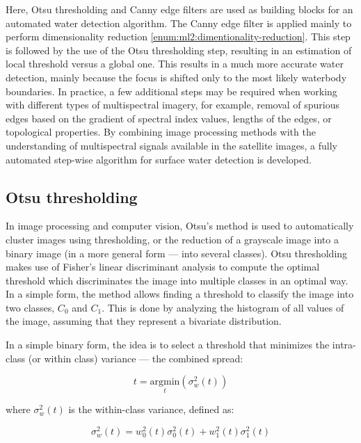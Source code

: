Here, Otsu thresholding and Canny edge filters are used as building blocks for an automated water detection algorithm. The Canny edge filter is applied mainly to perform dimensionality reduction \ref{enum:ml2:dimentionality-reduction}. This step is followed by the use of the Otsu thresholding step, resulting in an estimation of local threshold versus a global one. This results in a much more accurate water detection, mainly because the focus is shifted only to the most likely waterbody boundaries. In practice, a few additional steps may be required when working with different types of multispectral imagery, for example, removal of spurious edges based on the gradient of spectral index values, lengths of the edges, or topological properties. By combining image processing methods with the understanding of multispectral signals available in the satellite images, a fully automated step-wise algorithm for surface water detection is developed.

\subsection{Otsu thresholding}
In image processing and computer vision, Otsu's method \citet{otsu1975threshold} is used to automatically cluster images using thresholding, or the reduction of a grayscale image into a binary image (in a more general form --- into several classes). Otsu thresholding makes use of Fisher's linear discriminant analysis \citet{fisher1936use} to compute the optimal threshold which discriminates the image into multiple classes in an optimal way. In a simple form, the method allows finding a threshold to classify the image into two classes, $C_0$ and $C_1$. This is done by analyzing the histogram of all values of the image, assuming that they represent a bivariate distribution. 

In a simple binary form, the idea is to select a threshold that minimizes the intra-class (or within class) variance --- the combined spread:

\begin{equation}
t = \underset{t}{\mathrm{argmin}}\left(\sigma_w^2(t)\right)
\label{eq:otsu-withinclass}
\end{equation}

where $\sigma_w^2(t)$ is the within-class variance, defined as:

\begin{equation}
\sigma_w^2(t) = w_0^2(t) \sigma_0^2(t) + w_1^2(t) \sigma_1^2(t)
\end{equation}

